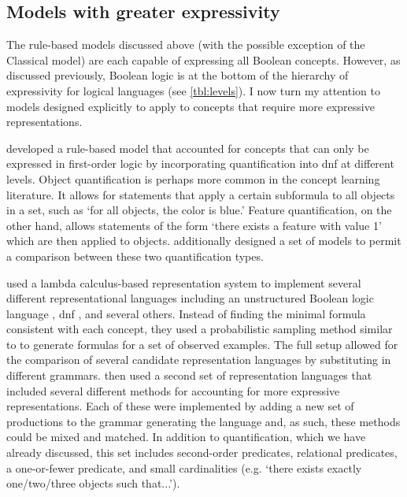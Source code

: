 \documentclass[doc,floatsintext]{apa6}
\begin{document}
\subsection{Models with greater expressivity}

The rule-based models discussed above (with the possible exception of the Classical model) are each capable of expressing all Boolean concepts. However, as discussed previously, Boolean logic is at the bottom of the hierarchy of expressivity for logical languages (see \cref{tbl:levels}). I now turn my attention to models designed explicitly to apply to concepts that require more expressive representations.

\citet{kemp2012} developed a rule-based model that accounted for concepts that can only be expressed in first-order logic by incorporating quantification into \ac{dnf} at different levels. Object quantification is perhaps more common in the concept learning literature. It allows for statements that apply a certain subformula to all objects in a set, such as `for all objects, the color is blue.'  Feature quantification, on the other hand, allows statements of the form `there exists a feature with value 1' which are then applied to objects. \citeauthor{kemp2012} additionally designed a set of models to permit a comparison between these two quantification types.

\citet{piantadositg2015} used a lambda calculus-based representation system to implement several different representational languages including an unstructured Boolean logic language \citep{feldman2000}, \ac{dnf} \citep{goodmantfg2008}, and several others.
Instead of finding the minimal formula consistent with each concept, they used a probabilistic sampling method similar to \citet{goodmantfg2008} to generate formulas for a set of observed examples.
The full setup allowed for the comparison of several candidate representation languages by substituting in different grammars. \citeauthor{piantadositg2015} then used a second set of representation languages that included several different methods for accounting for more expressive representations.
Each of these were implemented by adding a new set of productions to the grammar generating the language and, as such, these methods could be mixed and matched.
In addition to quantification, which we have already discussed, this set includes second-order predicates, relational predicates, a one-or-fewer predicate, and small cardinalities (e.g. `there exists exactly one/two/three objects such that...').
\end{document}
